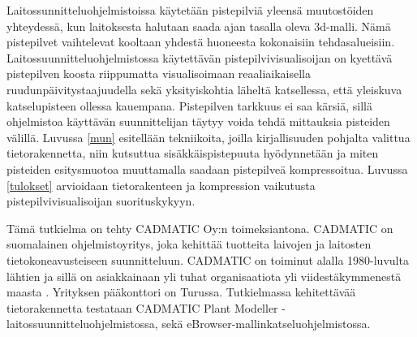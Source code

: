 Laitossunnitteluohjelmistoissa käytetään pistepilviä yleensä muutostöiden yhteydessä, kun laitoksesta halutaan saada ajan tasalla oleva 3d-malli. Nämä pistepilvet vaihtelevat kooltaan yhdestä huoneesta kokonaisiin tehdasalueisiin. Laitossuunnitteluohjelmistossa käytettävän pistepilvivisualisoijan on kyettävä pistepilven koosta riippumatta visualisoimaan reaaliaikaisella ruudunpäivitystaajuudella sekä yksityiskohtia läheltä katsellessa, että yleiskuva katselupisteen ollessa kauempana. Pistepilven tarkkuus ei saa kärsiä, sillä ohjelmistoa käyttävän suunnittelijan täytyy voida tehdä mittauksia pisteiden välillä. Luvussa \ref{mun} esitellään tekniikoita, joilla kirjallisuuden pohjalta valittua tietorakennetta, niin kutsuttua sisäkkäispistepuuta hyödynnetään ja miten pisteiden esitysmuotoa muuttamalla saadaan pistepilveä kompressoitua. Luvussa \ref{tulokset} arvioidaan tietorakenteen ja kompression vaikutusta pistepilvivisualisoijan suorituskykyyn. 

Tämä tutkielma on tehty CADMATIC Oy:n toimeksiantona. CADMATIC on suomalainen ohjelmistoyritys, joka kehittää tuotteita laivojen ja laitosten tietokoneavusteiseen suunnitteluun. CADMATIC on toiminut alalla 1980-luvulta lähtien ja sillä on asiakkainaan yli tuhat organisaatiota yli viidestäkymmenestä maasta \cite{cadmatic}. Yrityksen pääkonttori on Turussa. Tutkielmassa kehitettävää tietorakennetta testataan CADMATIC Plant Modeller -laitossuunnitteluohjelmistossa, sekä eBrowser-mallinkatseluohjelmistossa. 